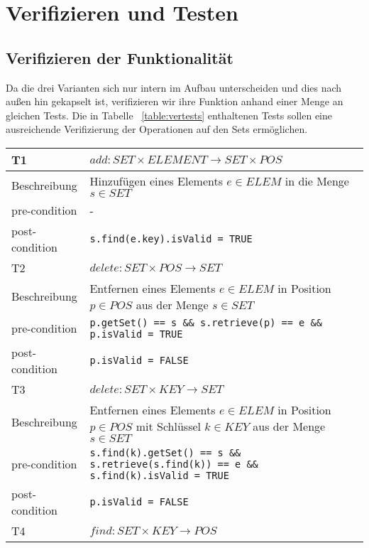 \documentclass[11pt]{scrartcl}
\begin{document}
\section{Verifizieren und Testen}
\label{sec:vertests}

\subsection{Verifizieren der Funktionalität}
\label{sec:verfun}
Da die drei Varianten sich nur intern im Aufbau unterscheiden und dies nach außen hin gekapselt ist, verifizieren wir ihre Funktion anhand einer Menge an gleichen Tests.
Die in Tabelle ~\ref{table:vertests} enthaltenen Tests sollen eine ausreichende Verifizierung der Operationen auf den Sets ermöglichen.

\begin{table}
\begin{tabular}[ht]{|l|p{12cm}|}
\hline
T1             & \(add : SET \times ELEMENT \to SET \times POS\) \\ \hline
Beschreibung  & Hinzufügen eines Elements \(e \in ELEM\) in die Menge \(s \in SET\)           \\ \hline
pre-condition  & -           \\ \hline
post-condition & \texttt{s.find(e.key).isValid = TRUE}           \\ \hline
\hline
T2             & \(delete : SET \times POS \to SET\) \\ \hline
Beschreibung  & Entfernen eines Elements \(e \in ELEM\) in Position \(p \in POS\) aus der Menge \(s \in SET\)           \\ \hline
pre-condition  & \texttt{p.getSet() == s \&\& s.retrieve(p) == e \&\& p.isValid = TRUE}            \\ \hline
post-condition & \texttt{p.isValid = FALSE}           \\ \hline
\hline
T3             & \(delete : SET \times KEY \to SET\) \\ \hline
Beschreibung  & Entfernen eines Elements \(e \in ELEM\) in Position \(p \in POS\) mit Schlüssel \(k \in KEY\) aus der Menge \(s \in SET\)           \\ \hline
pre-condition  & \texttt{s.find(k).getSet() == s \&\& s.retrieve(s.find(k)) == e \&\& s.find(k).isValid = TRUE}            \\ \hline
post-condition & \texttt{p.isValid = FALSE}           \\ \hline
\hline
T4             & \(find : SET \times KEY \to POS\) \\ \hline

\end{tabular}
\end{table}
\end{document}
